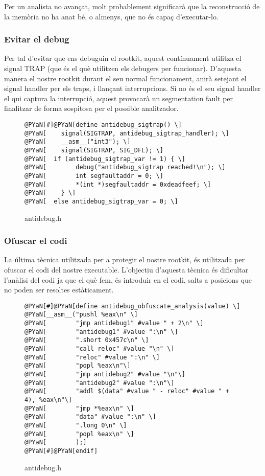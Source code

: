 Per un analista no avançat, molt probablement significarà que la reconstrucció de la memòria no ha anat bé,
o almenys, que no és capaç d'executar-lo.

\subsubsection{Evitar el debug}
Per tal d'evitar que ens debuguin el rootkit, aquest contínuament utilitza el signal TRAP (que és el 
què utilitzen els debugers per funcionar). D'aquesta manera el nostre rootkit durant el seu normal 
funcionament, anirà setejant el signal handler per els traps, i llançant interrupcions. Si no és el seu 
signal handler el qui captura la interrupció, aquest provocarà un segmentation fault per finalitzar
de forma sospitosa per el possible analitzador.

\begin{figure}[htp]
\begin{Verbatim}[commandchars=@\[\]]
@PYaN[#]@PYaN[define antidebug_sigtrap() \]
@PYaN[    signal(SIGTRAP, antidebug_sigtrap_handler); \]
@PYaN[    __asm__("int3"); \]
@PYaN[    signal(SIGTRAP, SIG_DFL); \]
@PYaN[	if (antidebug_sigtrap_var != 1) { \]
@PYaN[        debug("antidebug_sigtrap reached!\n"); \]
@PYaN[        int segfaultaddr = 0; \]
@PYaN[        *(int *)segfaultaddr = 0xdeadfeef; \]
@PYaN[    } \]
@PYaN[	else antidebug_sigtrap_var = 0; \]
\end{Verbatim}
\caption{antidebug.h}
\label{fig:antidebug_set_sigtrap}
\end{figure}

\subsubsection{Ofuscar el codi}
La última tècnica utilitzada per a protegir el nostre rootkit, és utilitzada per ofuscar el codi del nostre
executable. L'objectiu d'aquesta tècnica és dificultar l'anàlisi del codi ja que el què fem, és introduir
en el codi, salts a posicions que no poden ser resoltes estàticament.  \\

\begin{figure}[htp]
\begin{Verbatim}[commandchars=@\[\]]
@PYaN[#]@PYaN[define antidebug_obfuscate_analysis(value) \]
@PYaN[__asm__("pushl %eax\n" \]
@PYaN[        "jmp antidebug1" #value " + 2\n" \]
@PYaN[        "antidebug1" #value ":\n" \]
@PYaN[        ".short 0x457c\n" \]
@PYaN[        "call reloc" #value "\n" \]
@PYaN[        "reloc" #value ":\n" \]
@PYaN[        "popl %eax\n"\]
@PYaN[        "jmp antidebug2" #value "\n"\]
@PYaN[        "antidebug2" #value ":\n"\]
@PYaN[        "addl $(data" #value " - reloc" #value " + 4), %eax\n"\]
@PYaN[        "jmp *%eax\n" \]
@PYaN[        "data" #value ":\n" \]
@PYaN[        ".long 0\n" \]
@PYaN[        "popl %eax\n" \]
@PYaN[        );]
@PYaN[#]@PYaN[endif]
\end{Verbatim}
\caption{antidebug.h}
\label{fig:antidebug_obfuscate}
\end{figure}

